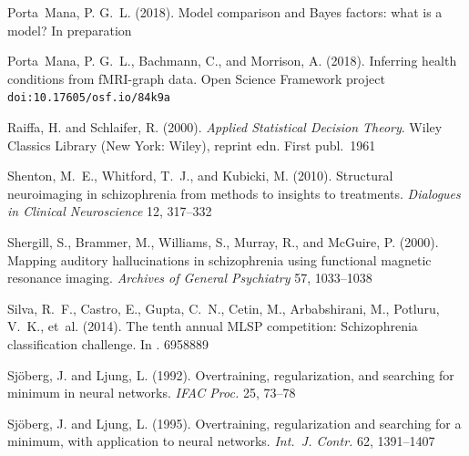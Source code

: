 \documentclass[%
]{frontiersSCNS-nologo} %
\providecommand{\href}[2]{#2}
\newcommand*{\citein}[2][]{\textnormal{\citet[#1]{#2}}%
}
\newcommand*{\osfeprint}[1]{%
\texttt{\urlalt{https://doi.org/10.17605/osf.io/#1}{doi:10.17605/osf.io/#1}}%
}
\providecommand*{\urlalt}{\href}
\renewcommand*{\|}{\mathpunct{|}}%
\begin{document}
\begin{thebibliography}{156}
Porta~Mana, P. G.~L. (2018{}).
\newblock Model comparison and {Bayes} factors: what is a model?
\newblock In preparation

Porta~Mana, P. G.~L., Bachmann, C., and Morrison, A. (2018).
\newblock Inferring health conditions from {fMRI-graph} data.
\newblock Open Science Framework project \osfeprint{84k9a}

Raiffa, H. and Schlaifer, R. (2000).
\newblock \emph{Applied Statistical Decision Theory}.
\newblock Wiley Classics Library (New York: Wiley), reprint edn.
\newblock First publ.\ 1961

Shenton, M.~E., Whitford, T.~J., and Kubicki, M. (2010).
\newblock Structural neuroimaging in schizophrenia from methods to insights to
  treatments.
\newblock \emph{Dialogues in Clinical Neuroscience} 12, 317--332

Shergill, S., Brammer, M., Williams, S., Murray, R., and McGuire, P. (2000).
\newblock Mapping auditory hallucinations in schizophrenia using functional
  magnetic resonance imaging.
\newblock \emph{Archives of General Psychiatry} 57, 1033--1038

Silva, R.~F., Castro, E., Gupta, C.~N., Cetin, M., Arbabshirani, M., Potluru,
  V.~K., et~al. (2014).
\newblock The tenth annual {MLSP} competition: Schizophrenia classification
  challenge.
\newblock In \emph{\citein{mboupetal2014}}. 6958889

Sj{\"o}berg, J. and Ljung, L. (1992).
\newblock Overtraining, regularization, and searching for minimum in neural
  networks.
\newblock \emph{IFAC Proc.} 25, 73--78

Sj{\"o}berg, J. and Ljung, L. (1995).
\newblock Overtraining, regularization and searching for a minimum, with
  application to neural networks.
\newblock \emph{Int.\ J. Contr.} 62, 1391--1407


\end{thebibliography}
\end{document}
